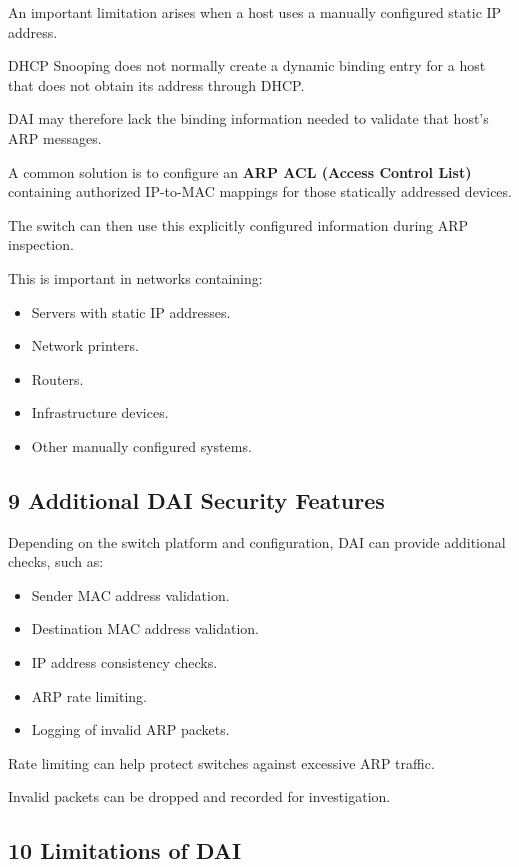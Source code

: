 An important limitation arises when a host uses a manually configured static IP address.

DHCP Snooping does not normally create a dynamic binding entry for a host that does not obtain its address through DHCP.

DAI may therefore lack the binding information needed to validate that host's ARP messages.

A common solution is to configure an \textbf{ARP ACL (Access Control List)} containing authorized IP-to-MAC mappings for those statically addressed devices.

The switch can then use this explicitly configured information during ARP inspection.

This is important in networks containing:

\begin{itemize}
\item Servers with static IP addresses.
\item Network printers.
\item Routers.
\item Infrastructure devices.
\item Other manually configured systems.
\end{itemize}

\subsection{9 Additional DAI Security Features}

Depending on the switch platform and configuration, DAI can provide additional checks, such as:

\begin{itemize}
\item Sender MAC address validation.
\item Destination MAC address validation.
\item IP address consistency checks.
\item ARP rate limiting.
\item Logging of invalid ARP packets.
\end{itemize}

Rate limiting can help protect switches against excessive ARP traffic.

Invalid packets can be dropped and recorded for investigation.

\subsection{10 Limitations of DAI}

